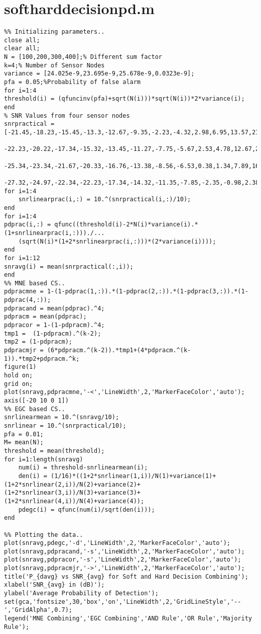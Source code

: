 \section{softharddecisionpd.m}
\begin{lstlisting}[breaklines]
% Soft Decision Combining for sensor nodes...
%% Initializing parameters..
close all;
clear all;
N = [100,200,300,400];% Different sum factor
k=4;% Number of Sensor Nodes
variance = [24.025e-9,23.695e-9,25.678e-9,0.0323e-9];
pfa = 0.05;%Probability of false alarm
for i=1:4
threshold(i) = (qfuncinv(pfa)+sqrt(N(i)))*sqrt(N(i))*2*variance(i);
end
% SNR Values from four sensor nodes
snrpractical = [-21.45,-18.23,-15.45,-13.3,-12.67,-9.35,-2.23,-4.32,2.98,6.95,13.57,21.78;...
                -22.23,-20.22,-17.34,-15.32,-13.45,-11.27,-7.75,-5.67,2.53,4.78,12.67,20.32;...
                -25.34,-23.34,-21.67,-20.33,-16.76,-13.38,-8.56,-6.53,0.38,1.34,7.89,16.54;...
                -27.32,-24.97,-22.34,-22.23,-17.34,-14.32,-11.35,-7.85,-2.35,-0.98,2.38,5.98];
for i=1:4
    snrlinearprac(i,:) = 10.^(snrpractical(i,:)/10);
end
for i=1:4
pdprac(i,:) = qfunc((threshold(i)-2*N(i)*variance(i).*(1+snrlinearprac(i,:)))./...
    (sqrt(N(i)*(1+2*snrlinearprac(i,:)))*(2*variance(i))));
end
for i=1:12
snravg(i) = mean(snrpractical(:,i));
end
%% MNE based CS..
pdpracmne = 1-(1-pdprac(1,:)).*(1-pdprac(2,:)).*(1-pdprac(3,:)).*(1-pdprac(4,:));
pdpracand = mean(pdprac).^4;
pdpracm = mean(pdprac);
pdpracor = 1-(1-pdpracm).^4;
tmp1 =  (1-pdpracm).^(k-2);
tmp2 = (1-pdpracm);
pdpracmjr = (6*pdpracm.^(k-2)).*tmp1+(4*pdpracm.^(k-1)).*tmp2+pdpracm.^k;
figure(1)
hold on;
grid on;
plot(snravg,pdpracmne,'-<','LineWidth',2,'MarkerFaceColor','auto');
axis([-20 10 0 1])
%% EGC based CS..
snrlinearmean = 10.^(snravg/10);
snrlinear = 10.^(snrpractical/10);
pfa = 0.01;
M= mean(N);
threshold = mean(threshold);
for i=1:length(snravg)
    num(i) = threshold-snrlinearmean(i);
    den(i) = (1/16)*((1+2*snrlinear(1,i))/N(1)+variance(1)+(1+2*snrlinear(2,i))/N(2)+variance(2)+(1+2*snrlinear(3,i))/N(3)+variance(3)+(1+2*snrlinear(4,i))/N(4)+variance(4));
    pdegc(i) = qfunc(num(i)/sqrt(den(i)));
end

%% Plotting the data..
plot(snravg,pdegc,'-d','LineWidth',2,'MarkerFaceColor','auto');
plot(snravg,pdpracand,'-s','LineWidth',2,'MarkerFaceColor','auto');
plot(snravg,pdpracor,'-s','LineWidth',2,'MarkerFaceColor','auto');
plot(snravg,pdpracmjr,'->','LineWidth',2,'MarkerFaceColor','auto');
title('P_{davg} vs SNR_{avg} for Soft and Hard Decision Combining');
xlabel('SNR_{avg} in (dB)');
ylabel('Average Probability of Detection');
set(gca,'fontsize',30,'box','on','LineWidth',2,'GridLineStyle','--','GridAlpha',0.7);
legend('MNE Combining','EGC Combining','AND Rule','OR Rule','Majority Rule');
\end{lstlisting}

